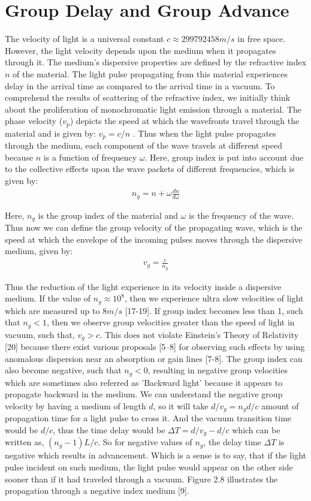 \section{Group Delay and Group Advance}
The velocity of light is a universal constant $c \approx 299792458 m/s$ in free space. However, the light velocity depends upon the medium when it propagates through it. The medium's dispersive properties are defined by the refractive index $n$ of the material. The light pulse propagating from this material experiences delay in the arrival time as compared to the arrival time in a vacuum. 
To comprehend the results of scattering of the refractive index, we initially think about the proliferation of monochromatic light emission through a material. The phase velocity ($v_{p}$) depicts the speed at which the wavefronts travel through the material and is given by: $v_{p} = c/n $ . Thus when the light pulse propagates through the medium, each component of the wave travels at different speed because $n$ is a function of frequency $\omega$. Here, group index is put into account due to the collective effects upon the wave packets of different frequencies, which is given by:
\begin{align*}
n_{g} = n + \omega\frac{dn}{d\omega}
\end{align*}

Here, $n_{g}$ is the group index of the material and $\omega$ is the frequency of the wave. Thus now we can define the group velocity of the propagating wave, which is the speed at which the envelope of the incoming pulses moves through the dispersive medium, given by:
\begin{align*}
v_{g} = \frac{c}{n_{g}}
\end{align*}

Thus the reduction of the light experience in its velocity inside a dispersive medium. If the value of $n_{g} \approx 10^{8}$, then we experience ultra slow velocities of light which are measured up to $8m/s$ [17-19]. If group index becomes less than 1, such that $n_{g} < 1$, then we observe group velocities greater than the speed of light in vacuum, such that, $v_{g} > c$. This does not violate Einstein's Theory of Relativity [20] because there exist various proposals [5–8] for observing such effects by using anomalous dispersion near an absorption or gain lines [7-8]. The group index can also become negative, such that $n_{g} < 0$, resulting in negative group velocities which are sometimes also referred as 'Backward light' because it appears to propagate backward in the medium. We can understand the negative group velocity by having a medium of length $d$, so it will take $d/v_{g} = n_{g}d/c$ amount of propagation time for a light pulse to cross it. And the vacuum transition time would be $d/c$, thus the time delay would be $\Delta T = d/v_{g} - d/c$ which can be written as, $(n_{g}-1)L/c$. So for negative values of $n_{g}$, the delay time $\Delta T$ is negative which results in advancement. Which is a sense is to say, that if the light pulse incident on such medium, the light pulse would appear on the other side sooner than if it had traveled through a vacuum. Figure 2.8 illustrates the propagation through a negative index medium [9]. 

